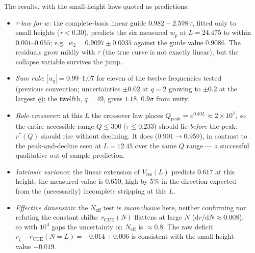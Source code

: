 \documentclass[12pt]{amsart}
\begin{document}
The results, with the small-height laws quoted as predictions:
\begin{itemize}
\item \emph{$\tau$-law for $w$}: the complete-basis linear guide
$0.982 - 2.598\,\tau$, fitted only to small heights ($\tau < 0.30$),
predicts the six measured $w_p$ at $L=24.475$ to within
$0.001$--$0.055$; e.g.\ $w_2 = 0.9097 \pm 0.0035$ against the guide
value $0.9086$. The residuals grow mildly with $\tau$ (the true curve
is not exactly linear), but the collapse variable survives the jump.
\item \emph{Sum rule}: $|u_q| = 0.99$--$1.07$ for eleven of the twelve
frequencies tested (previous convention; uncertainties $\pm 0.02$ at
$q=2$ growing to $\pm 0.2$ at the largest $q$); the twelfth, $q = 49$,
gives $1.18$, $0.9\sigma$ from unity.
\item \emph{Role-crossover}: at this $L$ the crossover law places
$Q_{\mathrm{peak}} = e^{0.40 L} \approx 2\times10^4$, so the entire
accessible range $Q \le 300$ ($\tau \le 0.233$) should lie \emph{before}
the peak: $r^*(Q)$ should rise without declining. It does
($0.901 \to 0.959$), in contrast to the peak-and-decline seen at
$L = 12.45$ over the same $Q$ range --- a successful qualitative
out-of-sample prediction.
\item \emph{Intrinsic variance}: the linear extension of
$V_{\mathrm{res}}(L)$ predicts $0.617$ at this height; the measured value
is $0.650$, high by $5\%$ in the direction expected from the (necessarily)
incomplete stripping at this $L$.
\item \emph{Effective dimension}: the $N_{\mathrm{eff}}$ test is
\emph{inconclusive} here, neither confirming nor refuting the constant
shifts: $r_{\mathrm{CUE}}(N)$ flattens at large $N$
($\mathrm{d}r/\mathrm{d}N \approx 0.008$), so with $10^4$ gaps the
uncertainty on $N_{\mathrm{eff}}$ is $\approx 0.8$. The raw deficit
$r_\zeta - r_{\mathrm{CUE}}(N{=}L) = -0.014 \pm 0.006$ is consistent with
the small-height value $-0.019$.
\end{itemize}
\end{document}
